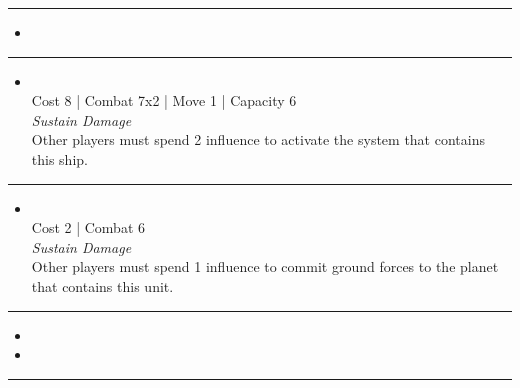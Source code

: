 \begin{multicols}{2}
\rule{\hsize}{0.4pt}\vspace{5pt}


\begin{itemize}
\item {}
\end{itemize}

\vspace{-10pt}\rule{\hsize}{0.4pt}\vspace{5pt}


\begin{itemize}
\item {}\\
Cost 8 | Combat 7x2 | Move 1 | Capacity 6 \\
\emph{Sustain Damage}\\
Other players must spend 2 influence to activate the system that contains this ship.
\end{itemize}

\vspace{-10pt}\rule{\hsize}{0.4pt}\vspace{5pt}


\begin{itemize}
\item {}
\\
Cost 2 | Combat 6
\\
\emph{Sustain Damage}
\\
Other players must spend 1 influence to commit ground forces to the planet that contains this unit.
\end{itemize}

\vspace{-10pt}\rule{\hsize}{0.4pt}\vspace{5pt}

\nounits

\columnbreak
{}

\begin{itemize}
\item \iihq
\item \asn
\end{itemize}

\vspace{-10pt}\rule{\hsize}{0.4pt}\vspace{5pt}


\end{multicols}
